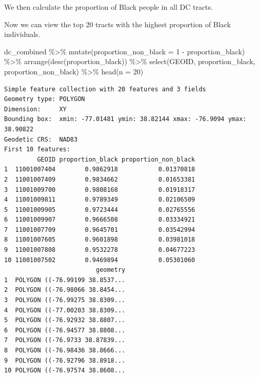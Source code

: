 \documentclass[
  letterpaper,
  DIV=11,
  numbers=noendperiod]{scrartcl}
\newenvironment{Shaded}{\begin{snugshade}}{\end{snugshade}}
\newcommand{\AttributeTok}[1]{\textcolor[rgb]{0.40,0.45,0.13}{#1}}
\newcommand{\ConstantTok}[1]{\textcolor[rgb]{0.56,0.35,0.01}{#1}}
\newcommand{\DecValTok}[1]{\textcolor[rgb]{0.68,0.00,0.00}{#1}}
\newcommand{\FunctionTok}[1]{\textcolor[rgb]{0.28,0.35,0.67}{#1}}
\newcommand{\NormalTok}[1]{\textcolor[rgb]{0.00,0.23,0.31}{#1}}
\newcommand{\OtherTok}[1]{\textcolor[rgb]{0.00,0.23,0.31}{#1}}
\newcommand{\SpecialCharTok}[1]{\textcolor[rgb]{0.37,0.37,0.37}{#1}}
\begin{document}
We then calculate the proportion of Black people in all DC tracts.

\begin{Shaded}
\end{Shaded}

Now we can view the top 20 tracts with the highest proportion of Black
individuals.

\begin{Shaded}
\begin{Highlighting}[]
\NormalTok{dc\_combined }\SpecialCharTok{\%\textgreater{}\%}
  \FunctionTok{mutate}\NormalTok{(}\AttributeTok{proportion\_non\_black =} \DecValTok{1} \SpecialCharTok{{-}}\NormalTok{ proportion\_black) }\SpecialCharTok{\%\textgreater{}\%} 
  \FunctionTok{arrange}\NormalTok{(}\FunctionTok{desc}\NormalTok{(proportion\_black)) }\SpecialCharTok{\%\textgreater{}\%} 
  \FunctionTok{select}\NormalTok{(GEOID, proportion\_black, proportion\_non\_black) }\SpecialCharTok{\%\textgreater{}\%} 
  \FunctionTok{head}\NormalTok{(}\AttributeTok{n =} \DecValTok{20}\NormalTok{)}
\end{Highlighting}
\end{Shaded}

\begin{verbatim}
Simple feature collection with 20 features and 3 fields
Geometry type: POLYGON
Dimension:     XY
Bounding box:  xmin: -77.01481 ymin: 38.82144 xmax: -76.9094 ymax: 38.90822
Geodetic CRS:  NAD83
First 10 features:
         GEOID proportion_black proportion_non_black
1  11001007404        0.9862918           0.01370818
2  11001007409        0.9834662           0.01653381
3  11001009700        0.9808168           0.01918317
4  11001009811        0.9789349           0.02106509
5  11001009905        0.9723444           0.02765556
6  11001009907        0.9666508           0.03334921
7  11001007709        0.9645701           0.03542994
8  11001007605        0.9601898           0.03981018
9  11001007808        0.9532278           0.04677223
10 11001007502        0.9469894           0.05301060
                         geometry
1  POLYGON ((-76.99199 38.8537...
2  POLYGON ((-76.98066 38.8454...
3  POLYGON ((-76.99275 38.8309...
4  POLYGON ((-77.00203 38.8309...
5  POLYGON ((-76.92932 38.8807...
6  POLYGON ((-76.94577 38.8808...
7  POLYGON ((-76.9733 38.87839...
8  POLYGON ((-76.98436 38.8666...
9  POLYGON ((-76.92796 38.8918...
10 POLYGON ((-76.97574 38.8608...
\end{verbatim}
\end{document}
